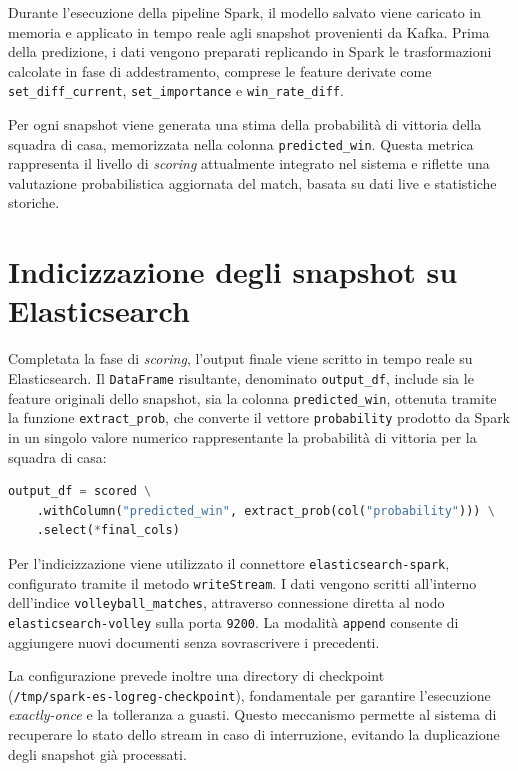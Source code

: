 \documentclass[a4paper,12pt]{report}
\begin{document}
Durante l’esecuzione della pipeline Spark, il modello salvato viene caricato in memoria e applicato in tempo reale agli snapshot provenienti da Kafka. Prima della predizione, i dati vengono preparati replicando in Spark le trasformazioni calcolate in fase di addestramento, comprese le feature derivate come \texttt{set\_diff\_current}, \texttt{set\_importance} e \texttt{win\_rate\_diff}.

Per ogni snapshot viene generata una stima della probabilità di vittoria della squadra di casa, memorizzata nella colonna \texttt{predicted\_win}. Questa metrica rappresenta il livello di \textit{scoring} attualmente integrato nel sistema e riflette una valutazione probabilistica aggiornata del match, basata su dati live e statistiche storiche.


\section{Indicizzazione degli snapshot su Elasticsearch}

Completata la fase di \textit{scoring}, l’output finale viene scritto in tempo reale su Elasticsearch. Il \texttt{DataFrame} risultante, denominato \texttt{output\_df}, include sia le feature originali dello snapshot, sia la colonna \texttt{predicted\_win}, ottenuta tramite la funzione \texttt{extract\_prob}, che converte il vettore \texttt{probability} prodotto da Spark in un singolo valore numerico rappresentante la probabilità di vittoria per la squadra di casa:

\begin{lstlisting}[language=Python]
output_df = scored \
    .withColumn("predicted_win", extract_prob(col("probability"))) \
    .select(*final_cols)
\end{lstlisting}

Per l’indicizzazione viene utilizzato il connettore \texttt{elasticsearch-spark}, configurato tramite il metodo \texttt{writeStream}. I dati vengono scritti all’interno dell’indice \texttt{volleyball\_matches}, attraverso connessione diretta al nodo \texttt{elasticsearch-volley} sulla porta \texttt{9200}. La modalità \texttt{append} consente di aggiungere nuovi documenti senza sovrascrivere i precedenti.

La configurazione prevede inoltre una directory di checkpoint \\ (\texttt{/tmp/spark-es-logreg-checkpoint}), fondamentale per garantire l’esecuzione \textit{exactly-once} e la tolleranza a guasti. Questo meccanismo permette al sistema di recuperare lo stato dello stream in caso di interruzione, evitando la duplicazione degli snapshot già processati.
\end{document}
